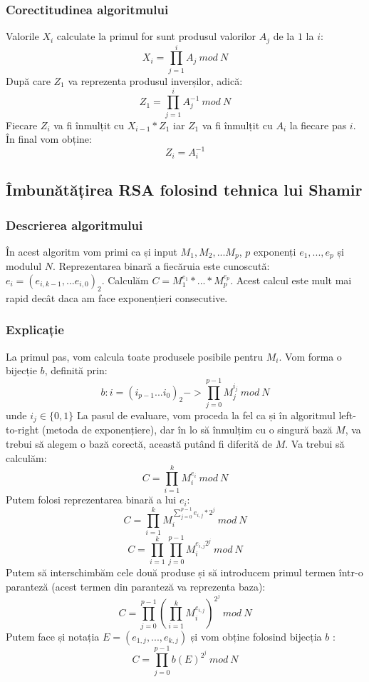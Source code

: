 \documentclass[12]{report}
\begin{document}
		   \subsubsection{Corectitudinea algoritmului}
		   Valorile $X_i$ calculate la primul for sunt produsul valorilor $A_j$ de la $1$ la $i$:
		   $$ X_i=\prod_{j=1}^{i} A_j \ mod \ N$$
		   După care $Z_1$ va reprezenta produsul inverșilor, adică:
		   $$Z_1=\prod_{j=1}^{i} A_{j}^{-1} \ mod \ N$$
		   Fiecare $Z_i$ va fi înmulțit cu $X_{i-1} * Z_1$ iar $Z_1$ va fi înmulțit cu $A_i$ la fiecare pas $i$. În final vom obține:
		   $$Z_i=A_{i}^{-1}$$ 
		   \subsection{Îmbunătățirea RSA folosind tehnica lui Shamir}
		   \subsubsection{Descrierea algoritmului}
		   În acest algoritm vom primi ca și input $M_1,M_2,...M_p$, $p$ exponenți $e_1,...,e_p$ și modulul $N$. Reprezentarea binară a fiecăruia este cunoscută: $e_i=(e_{i,k-1},...e_{i,0})_2$. Calculăm $C=M_{1}^{e_1}*...*M_{p}^{e_p}$. Acest calcul este mult mai rapid decât daca am face exponențieri consecutive.
		   \subsubsection{Explicație}
		   La primul pas, vom calcula toate produsele posibile pentru $M_i$. Vom forma o bijecție $b$, definită prin: \\
		   $$b:i=(i_{p-1}...i_0)_2 -> \prod_{j=0}^{p-1} M_{j}^{i_j} \ mod \ N$$
		   unde $i_j \in \lbrace  0,1  \rbrace $
		   La pasul de evaluare, vom proceda la fel ca și în algoritmul left-to-right (metoda de exponențiere), dar în lo să înmulțim cu o singură bază $M$, va trebui să alegem o bază corectă, această putând fi diferită de $M$. Va trebui să calculăm: 
		   $$ C = \prod_{i=1}^{k} M_{i}^{e_i} \ mod \ N$$
		   Putem folosi reprezentarea binară a lui $e_i$:
		   $$ C = \prod_{i=1}^{k} M_{i}^{\sum_{j=0}^{p-1} e_{i,j} * 2^j} \ mod \ N$$
		   $$ C = \prod_{i=1}^{k} \prod_{j=0}^{p-1} M_{i}^{e_{i,j}2^j} \ mod \ N$$
		   Putem să interschimbăm cele două produse și să introducem primul termen într-o paranteză (acest termen din paranteză va reprezenta baza):
		   $$C = \prod_{j=0}^{p-1} \left(   \prod_{i=1}^{k} M_{i}^{e_{i,j}}     \right)^{2^j} \ mod \ N $$
		   Putem face și notația $E=(e_{1,j},...,e_{k,j})$ și vom obține folosind bijecția $b$ :
		   $$ C = \prod_{j=0}^{p-1} b(E)^{2^j}  \ mod \ N$$
\end{document}
